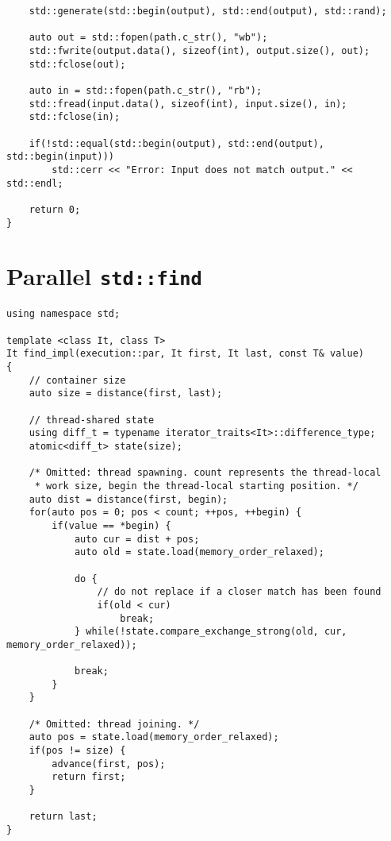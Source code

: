 \begin{appendix}
\begin{verbatim}
    std::generate(std::begin(output), std::end(output), std::rand);
    
    auto out = std::fopen(path.c_str(), "wb");
    std::fwrite(output.data(), sizeof(int), output.size(), out);
    std::fclose(out);
    
    auto in = std::fopen(path.c_str(), "rb");
    std::fread(input.data(), sizeof(int), input.size(), in);
    std::fclose(in);
    
    if(!std::equal(std::begin(output), std::end(output), std::begin(input)))
        std::cerr << "Error: Input does not match output." << std::endl;
        
    return 0;
}
\end{verbatim}

\section{Parallel \texttt{std::find}}\label{app:par_find}

\begin{verbatim}
using namespace std;

template <class It, class T>
It find_impl(execution::par, It first, It last, const T& value)
{
    // container size
    auto size = distance(first, last);
    
    // thread-shared state
    using diff_t = typename iterator_traits<It>::difference_type;
    atomic<diff_t> state(size);
    
    /* Omitted: thread spawning. count represents the thread-local
     * work size, begin the thread-local starting position. */
    auto dist = distance(first, begin);   
    for(auto pos = 0; pos < count; ++pos, ++begin) {
        if(value == *begin) {
            auto cur = dist + pos;
            auto old = state.load(memory_order_relaxed);
            
            do {
                // do not replace if a closer match has been found
                if(old < cur)
                    break;
            } while(!state.compare_exchange_strong(old, cur, memory_order_relaxed));
            
            break;
        }
    }
    
    /* Omitted: thread joining. */
    auto pos = state.load(memory_order_relaxed);
    if(pos != size) {
        advance(first, pos);
        return first;
    }
    
    return last;
}
\end{verbatim}

\end{appendix}